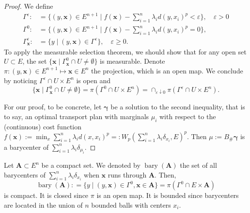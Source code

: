 \begin{proof}
	We define
	\begin{align*}
		\Gamma^\varepsilon:                   & =	\{
		(y,\boldsymbol{x}) \in E^{n+1} \mid  f(\boldsymbol{x}) - \sum_{i=1}^{n} \lambda_i d(y,x_i)^p < \varepsilon
		\}, \quad \varepsilon > 0                                                                           \\
		\Gamma^0:                             & =	\{
		(y,\boldsymbol{x}) \in E^{n+1} \mid  f(\boldsymbol{x}) - \sum_{i=1}^{n} \lambda_i d(y,x_i)^p = 0
		\},                                                                                                 \\
		\Gamma^\varepsilon_{\boldsymbol{x}} : & = \{ y \mid (y, \boldsymbol{x} ) \in \Gamma^\varepsilon \},
		\quad \varepsilon \geq 0.
	\end{align*}
	To apply the measurable selection theorem,
	we should show that for any open set $U \subset E$, the set
	$\{ \boldsymbol{x} \mid \Gamma^0_{\boldsymbol{x}} \cap U \ne \emptyset \}$
	is measurable.
	Denote $\pi: (y , \boldsymbol{x}) \in E^{n+1} \mapsto  \boldsymbol{x} \in E^n$ the projection,
	which is an open map.
	We conclude by noticing $ \Gamma^\varepsilon \cap U \times E^n $ is open and
	\[
		\{ \boldsymbol{x} \mid \Gamma^0_{\boldsymbol{x}} \cap U \ne \emptyset \}
		= \pi ( \Gamma^0  \cap U \times E^n)
		= \cap_{\varepsilon \downarrow 0}
		\pi ( \Gamma^\varepsilon \cap U \times E^n ).
	\]

	For our proof, to be concrete,
	let $\boldsymbol \gamma$ be a solution to the second inequality,
	that is to say,
	an optimal transport plan with marginals $\mu_i$ with respect to the (continuous) cost function
	$f(\boldsymbol{x}):=\min_{x} \sum_{i=1}^{n} \lambda_i d(x, x_i)^p = : W_p(\sum_{i=1}^n \lambda_i \delta_{x_i}, E)^p$.
	Then $\mu:= B_{\#}\boldsymbol \gamma$ is a barycenter of $\sum_{i=1}^{n}\lambda_i \delta_{\mu_i}$.
\end{proof}

\begin{rmk}
	\label{rmk:barycenter_compact}
	Let $\boldsymbol{A} \subset E^n$ be a compact set.
	We denoted by $\operatorname{bary}( \boldsymbol{A} )$
	the set of all barycenters of $\sum_{i=1}^n \lambda_i \delta_{x_i}$ when $\boldsymbol{x}$ runs through $\boldsymbol{A}$.
	Then,
	\[
		\operatorname{bary}( \boldsymbol{A} ) :
		=\{y \mid (y, \boldsymbol{x}) \in \Gamma^0, \boldsymbol{x} \in \boldsymbol{A} \}
		= \pi ( \Gamma^0  \cap E \times \boldsymbol{A})
	\]
	is compact.
	It is closed since $\pi$ is an open map.
	It is bounded since barycenters are located in the union of $n$ bounded balls with centers $x_i$.
\end{rmk}
